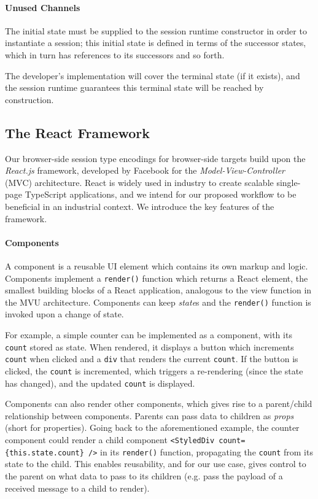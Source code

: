 \paragraph{Unused Channels}
The initial state must be supplied to the session runtime
constructor in order to instantiate a session;
this initial state is defined
in terms of the successor states, which in turn has references to its
successors and so forth.

The developer's implementation will cover the terminal state
(if it exists), and the
session runtime guarantees this terminal state will be reached
by construction.

\subsection{The React Framework}
Our browser-side session type encodings for browser-side targets build upon the
\emph{React.js} framework, developed by Facebook \cite{React} for the
\textit{Model-View-Controller} (MVC) architecture.
React is widely used in industry to create scalable single-page TypeScript
applications, and we intend for our proposed workflow to be beneficial in an
industrial context.
We introduce the key features of the framework.

\paragraph{Components}
A component is a reusable UI element which
contains its own markup and logic.
Components implement a \texttt{render()} function which returns a React
element, the smallest building blocks of a React application, analogous to the
view function in the MVU architecture.
Components can keep \textit{state}s and the \texttt{render()} function is
invoked upon a change of state.

For example, a simple counter can be implemented as a component,
with its \texttt{count} stored as state.
When rendered, it displays a button which increments \texttt{count}
when clicked and a \texttt{div} that renders the current
\texttt{count}.
If the button is clicked, the \texttt{count} is incremented, which triggers a
re-rendering (since the state has changed), and the updated \texttt{count} is
displayed.

Components can also render other components, which gives rise
to a parent/child relationship between components.
Parents can pass data to children as \textit{props} (short for properties).
Going back to the aforementioned example, the counter component could
render a child component \texttt{<StyledDiv count=\{this.state.count\} />} in
its \texttt{render()} function, propagating the \texttt{count} from its state
to the child.
This enables reusability, and for our use case, gives control to the parent
on what data to pass to its children (e.g. pass the payload of a received
message to a child to render).

